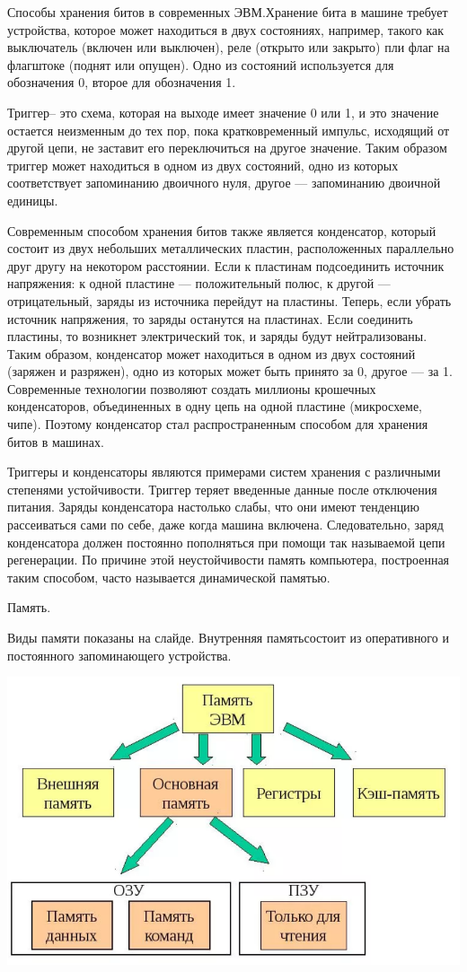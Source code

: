 \documentclass[a4paper]{article}
\begin{document}
Способы хранения битов в современных ЭВМ.Хранение бита в машине требует устройства, которое может находиться в двух состояниях, например, такого как выключатель (включен или выключен), реле (открыто или закрыто) пли флаг на флагштоке (поднят или опущен). Одно из состояний используется для обозначения 0, второе для обозначения 1.

Триггер– это схема, которая на выходе имеет значение 0 или 1, и это значение остается неизменным до тех пор, пока кратковременный импульс, исходящий от другой цепи, не заставит его переключиться на другое значение. Таким образом триггер может находиться в одном из двух состояний, одно из которых соответствует запоминанию двоичного нуля, другое — запоминанию двоичной единицы.

Современным способом хранения битов также является конденсатор, который состоит из двух небольших металлических пластин, расположенных параллельно друг другу на некотором расстоянии. Если к пластинам подсоединить источник напряжения: к одной пластине — положительный полюс, к другой — отрицательный, заряды из источника перейдут на пластины. Теперь, если убрать источник напряжения, то заряды останутся на пластинах. Если соединить пластины, то возникнет электрический ток, и заряды будут нейтрализованы. Таким образом, конденсатор может находиться в одном из двух состояний (заряжен и разряжен), одно из которых может быть принято за 0, другое — за 1. Современные технологии позволяют создать миллионы крошечных конденсаторов, объединенных в одну цепь на одной пластине (микросхеме, чипе). Поэтому конденсатор стал распространенным способом для хранения битов в машинах.

Триггеры и конденсаторы являются примерами систем хранения с различными степенями устойчивости. Триггер теряет введенные данные после отключения питания. Заряды конденсатора настолько слабы, что они имеют тенденцию рассеиваться сами по себе, даже когда машина включена. Следовательно, заряд конденсатора должен постоянно пополняться при помощи так называемой цепи регенерации. По причине этой неустойчивости память компьютера, построенная таким способом, часто называется динамической памятью.

Память.

Виды памяти показаны на слайде. Внутренняя памятьсостоит из оперативного и постоянного запоминающего устройства.

\includegraphics[width=\textwidth]{mem_l.png}
\end{document}
